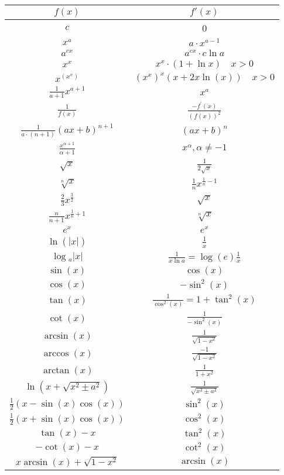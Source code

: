 \begin{tabular}{c||c}
$f(x)$ & $f'(x)$ \\
\hline$c$ & 0 \\
$x^{a}$ & $a \cdot x^{a-1}$ \\
$a^{c x}$ & $a^{c x} \cdot c \ln a$ \\
$x^{x}$ & $x^{x} \cdot(1+\ln x) \quad x>0$ \\
$x^{\left(x^{x}\right)}$ & $\left(x^{x}\right)^{x}(x+2 x \ln (x)) \quad x>0$ \\
$\frac{1}{a+1} x^{a+1}$ & $x^{a}$ \\
$\frac{1}{f(x)}$ & $\frac{-f^{\prime}(x)}{(f(x))^{2}}$ \\
$\frac{1}{a \cdot(n+1)}(a x+b)^{n+1}$ & $(a x+b)^{n}$ \\
$\frac{x^{\alpha+1}}{\alpha+1}$ & $x^{\alpha}, \alpha \neq-1$ \\
$\sqrt{x}$ & $\frac{1}{2 \sqrt{x}}$ \\
$\sqrt[n]{x}$ & $\frac{1}{n} x^{\frac{1}{n}-1}$ \\
$\frac{2}{3} x^{\frac{3}{2}}$ & $\sqrt{x}$ \\
$\frac{n}{n+1} x^{\frac{1}{n}+1}$ & $\sqrt[n]{x}$ \\
$e^{x}$ & $e^{x}$ \\
$\ln (|x|)$ & $\frac{1}{x}$ \\
$\log { }_{a}|x|$ & $\frac{1}{x \ln a}=\log (e) \frac{1}{x}$ \\
$\sin (x)$ & $\cos (x)$ \\
$\cos (x)$ & $-\sin ^{2}(x)$ \\
$\tan (x)$ & $\frac{1}{\cos ^{2}(x)}=1+\tan ^{2}(x)$ \\
$\cot (x)$ & $\frac{1}{-\sin ^{2}(x)}$ \\
$\arcsin (x)$ & $\frac{1}{\sqrt{1-x^{2}}}$ \\
$\arccos (x)$ & $\frac{-1}{\sqrt{1-x^{2}}}$ \\
$\arctan (x)$ & $\frac{1}{1+x^{2}}$ \\
  $\ln \left(x+\sqrt{x^{2} \pm a^{2}}\right)$ & $\frac{1}{\sqrt{x^{2} \pm a^{2}}}$ \\
 $\frac{1}{2}(x-\sin (x) \cos (x))$ & $\sin ^{2}(x)$ \\
 $\frac{1}{2}(x+\sin (x) \cos (x))$ & $\cos ^{2}(x)$ \\
  $\tan (x)-x$ & $\tan ^{2}(x)$ \\
 $-\cot (x)-x$ & $\cot ^{2}(x)$ \\
 $x \arcsin (x)+\sqrt{1-x^{2}}$ & $\arcsin (x)$ \\

\end{tabular}
